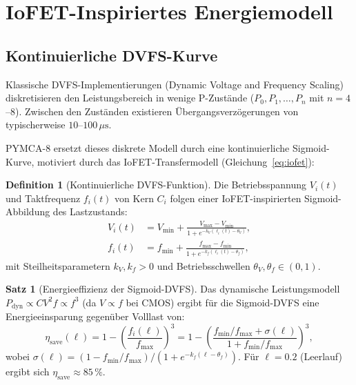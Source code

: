﻿\documentclass[a4paper,12pt]{scrreprt}
\theoremstyle{definition}
\newtheorem{definition}{Definition}[section]
\newtheorem{satz}{Satz}[section]
\begin{document}
	\section{IoFET-Inspiriertes Energiemodell}
	\label{sec:energy}
	
	\subsection{Kontinuierliche DVFS-Kurve}
	
	Klassische DVFS-Implementierungen (Dynamic Voltage and Frequency Scaling)
	diskretisieren den Leistungsbereich in wenige P-Zustände
	($P_0, P_1, \ldots, P_n$ mit $n = 4$--$8$). Zwischen den Zuständen
	existieren Übergangsverzögerungen von typischerweise $10$--$100\,\mu\mathrm{s}$.
	
	PYMCA-8 ersetzt dieses diskrete Modell durch eine kontinuierliche
	Sigmoid-Kurve, motiviert durch das IoFET-Transfermodell
	(Gleichung~\eqref{eq:iofet}):
	
	\begin{definition}[Kontinuierliche DVFS-Funktion]
		\label{def:continuous_dvfs}
		Die Betriebsspannung $V_i(t)$ und Taktfrequenz $f_i(t)$ von Kern $C_i$
		folgen einer IoFET-inspirierten Sigmoid-Abbildung des Lastzustands:
		\begin{align}
			V_i(t) &= V_{\min} + \frac{V_{\max} - V_{\min}}{1 + e^{-k_V(\ell_i(t) - \theta_V)}},
			\label{eq:voltage} \\
			f_i(t) &= f_{\min} + \frac{f_{\max} - f_{\min}}{1 + e^{-k_f(\ell_i(t) - \theta_f)}},
			\label{eq:freq}
		\end{align}
		mit Steilheitsparametern $k_V, k_f > 0$ und Betriebsschwellen
		$\theta_V, \theta_f \in (0,1)$.
	\end{definition}
	
	\begin{satz}[Energieeffizienz der Sigmoid-DVFS]
		\label{satz:sigmoid_eff}
		Das dynamische Leistungsmodell $P_{\mathrm{dyn}} \propto C V^2 f \propto f^3$
		(da $V \propto f$ bei CMOS) ergibt für die Sigmoid-DVFS eine
		Energieeinsparung gegenüber Volllast von:
		\[
		\eta_{\mathrm{save}}(\ell) = 1 - \left(\frac{f_i(\ell)}{f_{\max}}\right)^3
		= 1 - \left(\frac{f_{\min}/f_{\max} + \sigma(\ell)}{1 + f_{\min}/f_{\max}}\right)^3,
		\]
		wobei $\sigma(\ell) = (1 - f_{\min}/f_{\max})/(1 + e^{-k_f(\ell - \theta_f)})$.
		Für $\ell = 0.2$ (Leerlauf) ergibt sich $\eta_{\mathrm{save}} \approx 85\,\%$.
	\end{satz}
	
\end{document}
